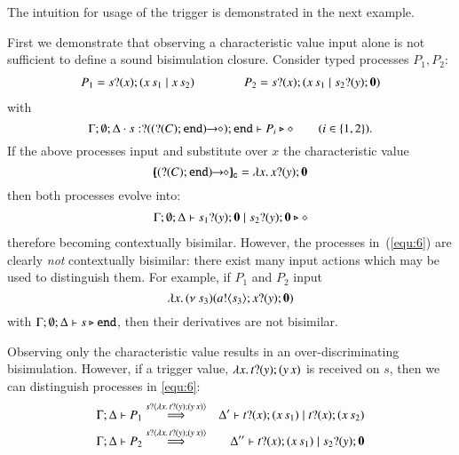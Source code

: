 The intuition for usage of the trigger is
demonstrated in the next example.
%
\begin{example}
	\label{ex:motivation}
	First we demonstrate that observing a characteristic value
	input alone is not sufficient
	to define a sound bisimulation closure.
	Consider typed processes $P_1, P_2$:
%
	\begin{eqnarray}
		P_1 = s ? (x) ; (x\,s_1 \;|\; x\,s_2) 
		\qquad \qquad
		P_2 = s ? (x) ; (x\,s_1 \;|\; s_2 ? (y) ; \mathbf{0}) 
		\label{equ:6}
	\end{eqnarray}
%
	with
	\[
		\Gamma; \emptyset; \Delta \cdot s: ? ((? (C) ; \mathtt{end})\!\! \rightarrow\!\! \diamond) ; \mathtt{end} \vdash P_i \triangleright \diamond \qquad (i \in \{1,2\}).
	\]
%
	If the above processes input and substitute over $x$
	the characteristic value 
	\[
		\omapchar{\shot{(\btinp{C} \tinact)}} = \abs{x}{\binp{x}{y} \inact}
	\] 
	\noi then both processes evolve into:
%
	\begin{eqnarray*}
		\Gamma; \emptyset; \Delta \vdash s_1 ? (y) ; \mathbf{0} \;|\; s_2 ? (y) ; \mathbf{0} \triangleright \diamond
	\end{eqnarray*}
	\noi therefore becoming  contextually bisimilar.
	However, the processes in~(\ref{equ:6})
	are clearly {\em not} contextually bisimilar:
	there exist many input actions
	which may be used to distinguish them.
	For example, if 
	$P_1$ and $P_2$ input
%
	\[
		\lambda x.\,(\nu\ s_3)(a ! \langle s_3 \rangle ; x ? (y) ; \mathbf{0})
	\]
%
	\noi with
	$\Gamma; \emptyset; \Delta \vdash s \triangleright \mathtt{end}$,
	then their derivatives are not bisimilar.

	Observing only the characteristic value 
	results in an over-discriminating bisimulation.
	However, if a trigger value, 
	$\lambda {x}.\,t ? (y) ; (y\,{x})$
	is received on $s$, 
	then we can distinguish 
	processes in \eqref{equ:6}:  
%
	\begin{eqnarray*}
		\Gamma; \Delta \vdash P_1 &\stackrel{s ? \langle \lambda {x}.\,t ? (y) ; (y\,{x}) \rangle}{\Longrightarrow}& \Delta' \vdash t ? (x) ; (x\,s_1) \;|\; t ? (x) ; (x\,s_2)
		\\
		\Gamma; \Delta \vdash P_2 &\stackrel{s ? \langle \lambda {x}.\,t ? (y) ; (y\,{x}) \rangle}{\Longrightarrow}& \Delta'' \vdash t ? (x) ; (x\,s_1) \;|\; s_2 ? (y) ; \mathbf{0}
	\end{eqnarray*}
%


\end{example}
